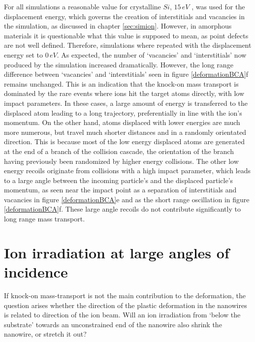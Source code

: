 For all simulations a reasonable value for crystalline $Si$, $15\,eV$ \cite{corbett_production_1965}, was used for the displacement energy, which governs the creation of interstitials and vacancies in the simulation, as discussed in chapter \ref{sec:simion}. However, in amorphous materials it is questionable what this value is supposed to mean, as point defects are not well defined. Therefore, simulations where repeated with the displacement energy set to $0\,eV$. As expected, the number of `vacancies' and `interstitials' now produced by the simulation increased dramatically. However, the long range difference between `vacancies' and `interstitials' seen in figure \ref{deformationBCA}f remains unchanged. This is an indication that the knock-on mass transport is dominated by the rare events where ions hit the target atoms directly, with low impact parameters. In these cases, a large amount of energy is transferred to the displaced atom leading to a long trajectory, preferentially in line with the ion's momentum. On the other hand, atoms displaced with lower energies are much more numerous, but travel much shorter distances and in a randomly orientated direction. This is because most of the low energy displaced atoms are generated at the end of a branch of the collision cascade, the orientation of the branch having previously been randomized by higher energy collisions. The other low energy recoils originate from collisions with a high impact parameter, which leads to a large angle between the incoming particle's and the displaced particle's momentum, as seen near the impact point as a separation of interstitials and vacancies in figure \ref{deformationBCA}e and as the short range oscillation in figure \ref{deformationBCA}f. These large angle recoils do not contribute significantly to long range mass transport.

\clearpage
\section{Ion irradiation at large angles of incidence}

If knock-on mass-transport is not the main contribution to the deformation, the question arises whether the direction of the plastic deformation in the nanowires is related to direction of the ion beam. Will an ion irradiation from `below the substrate' towards an unconstrained end of the nanowire also shrink the nanowire, or stretch it out? 

